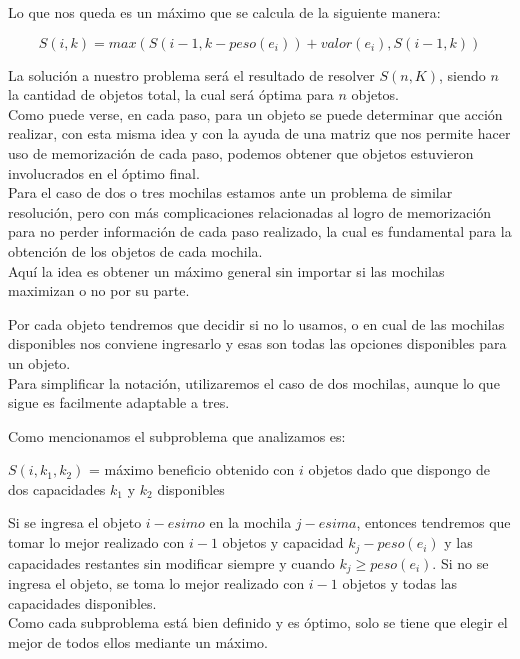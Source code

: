 Lo que nos queda es un máximo que se calcula de la siguiente manera:

\begin{equation}
S(i, k) = max(S(i-1, k-peso(e_i))+valor(e_i), S(i-1, k))
\end{equation}

La solución a nuestro problema será el resultado de resolver $S(n, K)$, siendo $n$ la cantidad de objetos total, la cual será óptima para $n$ objetos.\\

Como puede verse, en cada paso, para un objeto se puede determinar que acción realizar, con esta misma idea y con la ayuda de una matriz que nos permite hacer uso de memorizaci\'on de cada paso, podemos obtener que objetos estuvieron involucrados en el \'optimo final.\\

Para el caso de dos o tres mochilas estamos ante un problema de similar resolución, pero con más complicaciones relacionadas al logro de memorización para no perder información de cada paso realizado, la cual es fundamental para la obtención de los objetos de cada mochila.\\

Aquí la idea es obtener un máximo general sin importar si las mochilas maximizan o no por su parte.

Por cada objeto tendremos que decidir si no lo usamos, o en cual de las mochilas disponibles nos conviene ingresarlo y esas son todas las opciones disponibles para un objeto.\\
Para simplificar la notación, utilizaremos el caso de dos mochilas, aunque lo que sigue es facilmente adaptable a tres.

Como mencionamos el subproblema que analizamos es:

\begin{center}
$S(i, k_1, k_2)$ = máximo beneficio obtenido con $i$ objetos dado que dispongo de dos capacidades $k_1$ y $k_2$ disponibles
\end{center}

Si se ingresa el objeto $i-esimo$ en la mochila $j-esima$, entonces tendremos que tomar lo mejor realizado con $i-1$ objetos y capacidad $k_j-peso(e_i)$ y las capacidades restantes sin modificar siempre y cuando $k_j \geq peso(e_i)$.
Si no se ingresa el objeto, se toma lo mejor realizado con $i-1$ objetos y todas las capacidades disponibles.\\

Como cada subproblema está bien definido y es óptimo, solo se tiene que elegir el mejor de todos ellos mediante un máximo. 

